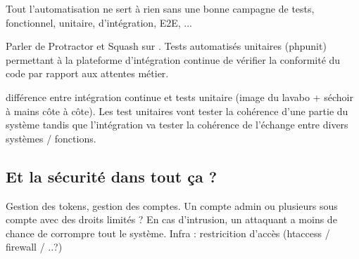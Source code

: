Tout l'automatisation ne sert à rien sans une bonne campagne de tests, fonctionnel, unitaire, d'intégration, E2E, ...

Parler de Protractor et Squash sur \bv. Tests automatisés unitaires (phpunit) permettant à la plateforme d'intégration continue de vérifier la conformité du code par rapport aux attentes métier.

différence entre intégration continue et tests unitaire (image du lavabo + séchoir à mains côte à côte). Les test unitaires vont tester la cohérence d'une partie du système tandis que l'intégration va tester la cohérence de l'échange entre divers systèmes / fonctions.

\subsection{Et la sécurité dans tout ça ?}

Gestion des tokens, gestion des comptes.
Un compte admin ou plusieurs sous compte avec des droits limités ? En cas d'intrusion, un attaquant a moins de chance de corrompre tout le système.
Infra : restricition d'accès (htaccess / firewall / ..?)
